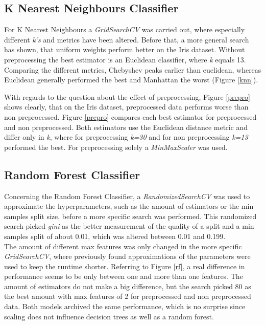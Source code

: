 
\subsection{K Nearest Neighbours Classifier}
For K Nearest Neighbours a \textit{GridSearchCV} was carried out, where especially different \textit{k's} and metrics have been altered. Before that, a more general search has shown, that uniform weights perform better on the Iris dataset. Without preprocessing the best estimator is an Euclidean classifier, where \textit{k} equals 13. Comparing the different metrics, Chebyshev peaks earlier than euclidean, whereas Euclidean generally performed the best and Manhattan the worst (Figure \ref{knn}). 


With regards to the question about the effect of preprocessing, Figure \ref{prepro} shows clearly, that on the Iris dataset, preprocessed data performs worse than non preprocessed. Figure \ref{prepro} compares each best estimator for preprocessed and non preprocessed. Both estimators use the Euclidean distance metric and differ only in \textit{k}, where for preprocessing \textit{k=30} and for non preprocessing \textit{k=13} performed the best.  For preprocessing solely a \textit{MinMaxScaler} was used.


\subsection{Random Forest Classifier}
Concerning the Random Forest Classifier, a \textit{RandomizedSearchCV} was used to approximate the hyperparameters, such as the amount of estimators or the min samples split size, before a more specific search was performed. This randomized search picked \textit{gini} as the better measurement of the quality of a split and a min samples split of about 0.01, which was altered between 0.01 and 0.199. \\
The amount of different max features was only changed in the more specific \textit{GridSearchCV}, where previously found approximations of the parameters were used to keep the runtime shorter. Referring to Figure \ref{rf}, a real difference in performance seems to be only between one and more than one features. The amount of estimators do not make a big difference, but the search picked 80 as the best amount with max features of 2 for preprocessed and non preprocessed data. Both models archived the same performance, which is no surprise since scaling does not influence decision trees as well as a random forest.

